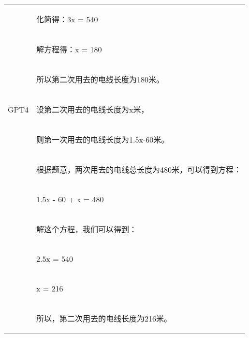 \documentclass{article}
\begin{document}
\begin{table}[h!]
\begin{tabular}{ c|l }
             & \begin{CJK*}{UTF8}{gbsn} 化简得：3x = 540 \end{CJK*}\\
             & \begin{CJK*}{UTF8}{gbsn} 解方程得：x = 180 \end{CJK*}\\
             & \begin{CJK*}{UTF8}{gbsn} 所以第二次用去的电线长度为180米。 \end{CJK*}\\
 \hline
 GPT4 & \begin{CJK*}{UTF8}{gbsn} 设第二次用去的电线长度为x米，\end{CJK*}\\
             & \begin{CJK*}{UTF8}{gbsn} 则第一次用去的电线长度为1.5x-60米。 \end{CJK*}\\
             & \begin{CJK*}{UTF8}{gbsn} 根据题意，两次用去的电线总长度为480米，可以得到方程： \end{CJK*} \\
             & \begin{CJK*}{UTF8}{gbsn} 1.5x - 60 + x = 480 \end{CJK*} \\
             & \begin{CJK*}{UTF8}{gbsn} 解这个方程，我们可以得到：\end{CJK*} \\
             & \begin{CJK*}{UTF8}{gbsn} 2.5x = 540 \end{CJK*} \\
             & \begin{CJK*}{UTF8}{gbsn} x = 216 \end{CJK*} \\
             & \begin{CJK*}{UTF8}{gbsn} 所以，第二次用去的电线长度为216米。 \end{CJK*} \\
 \hline
\end{tabular}
\end{table}
\end{document}
